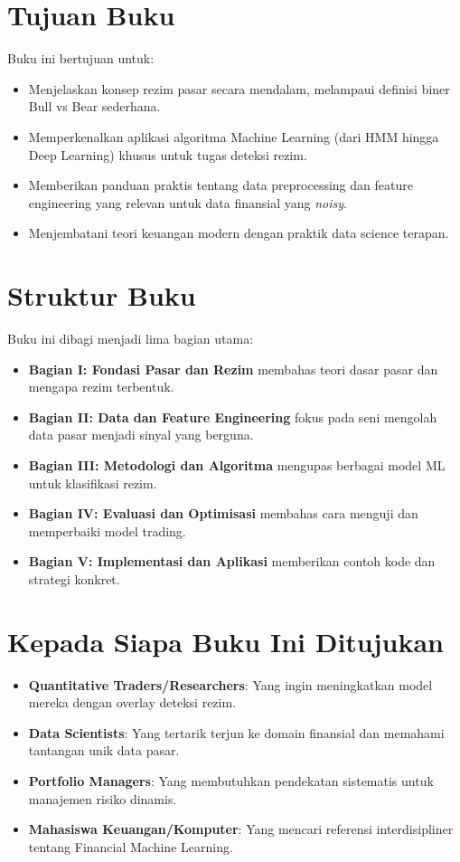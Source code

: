 \documentclass[12pt,a4paper]{book}
\begin{document}
\section*{Tujuan Buku}
Buku ini bertujuan untuk:
\begin{itemize}
    \item Menjelaskan konsep rezim pasar secara mendalam, melampaui definisi biner Bull vs Bear sederhana.
    \item Memperkenalkan aplikasi algoritma Machine Learning (dari HMM hingga Deep Learning) khusus untuk tugas deteksi rezim.
    \item Memberikan panduan praktis tentang data preprocessing dan feature engineering yang relevan untuk data finansial yang \textit{noisy}.
    \item Menjembatani teori keuangan modern dengan praktik data science terapan.
\end{itemize}

\section*{Struktur Buku}
Buku ini dibagi menjadi lima bagian utama:
\begin{itemize}
    \item \textbf{Bagian I: Fondasi Pasar dan Rezim} membahas teori dasar pasar dan mengapa rezim terbentuk.
    \item \textbf{Bagian II: Data dan Feature Engineering} fokus pada seni mengolah data pasar menjadi sinyal yang berguna.
    \item \textbf{Bagian III: Metodologi dan Algoritma} mengupas berbagai model ML untuk klasifikasi rezim.
    \item \textbf{Bagian IV: Evaluasi dan Optimisasi} membahas cara menguji dan memperbaiki model trading.
    \item \textbf{Bagian V: Implementasi dan Aplikasi} memberikan contoh kode dan strategi konkret.
\end{itemize}

\section*{Kepada Siapa Buku Ini Ditujukan}
\begin{itemize}
    \item \textbf{Quantitative Traders/Researchers}: Yang ingin meningkatkan model mereka dengan overlay deteksi rezim.
    \item \textbf{Data Scientists}: Yang tertarik terjun ke domain finansial dan memahami tantangan unik data pasar.
    \item \textbf{Portfolio Managers}: Yang membutuhkan pendekatan sistematis untuk manajemen risiko dinamis.
    \item \textbf{Mahasiswa Keuangan/Komputer}: Yang mencari referensi interdisipliner tentang Financial Machine Learning.
\end{itemize}
\end{document}
